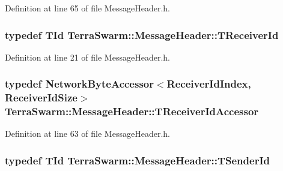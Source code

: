 Definition at line 65 of file Message\-Header.\-h.

\hypertarget{class_terra_swarm_1_1_message_header_aa3260702b182b6f88ddbdd3416e98df0}{
\subsubsection[{T\-Receiver\-Id}]{\setlength{\rightskip}{0pt plus 5cm}typedef {\bf T\-Id} {\bf Terra\-Swarm\-::\-Message\-Header\-::\-T\-Receiver\-Id}}}\label{class_terra_swarm_1_1_message_header_aa3260702b182b6f88ddbdd3416e98df0}


Definition at line 21 of file Message\-Header.\-h.

\hypertarget{class_terra_swarm_1_1_message_header_a9725379883f5e9451d235fb4bd1c8ee3}{
\subsubsection[{T\-Receiver\-Id\-Accessor}]{\setlength{\rightskip}{0pt plus 5cm}typedef {\bf Network\-Byte\-Accessor}$<${\bf Receiver\-Id\-Index}, {\bf Receiver\-Id\-Size}$>$ {\bf Terra\-Swarm\-::\-Message\-Header\-::\-T\-Receiver\-Id\-Accessor}\hspace{0.3cm}{\ttfamily [private]}}}\label{class_terra_swarm_1_1_message_header_a9725379883f5e9451d235fb4bd1c8ee3}


Definition at line 63 of file Message\-Header.\-h.

\hypertarget{class_terra_swarm_1_1_message_header_a516b36855e2aad7cfbf8770f1b42784f}{
\subsubsection[{T\-Sender\-Id}]{\setlength{\rightskip}{0pt plus 5cm}typedef {\bf T\-Id} {\bf Terra\-Swarm\-::\-Message\-Header\-::\-T\-Sender\-Id}}}\label{class_terra_swarm_1_1_message_header_a516b36855e2aad7cfbf8770f1b42784f}


